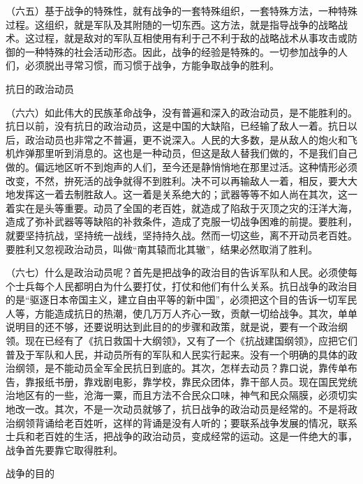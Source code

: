 \documentclass[UTF8, 12pt, a4paper]{ctexrep}
\begin{document}
（六五）基于战争的特殊性，就有战争的一套特殊组织，一套特殊方法，一种特殊过程。这组织，就是军队及其附随的一切东西。这方法，就是指导战争的战略战术。这过程，就是敌对的军队互相使用有利于己不利于敌的战略战术从事攻击或防御的一种特殊的社会活动形态。因此，战争的经验是特殊的。一切参加战争的人们，必须脱出寻常习惯，而习惯于战争，方能争取战争的胜利。

抗日的政治动员

（六六）如此伟大的民族革命战争，没有普遍和深入的政治动员，是不能胜利的。抗日以前，没有抗日的政治动员，这是中国的大缺陷，已经输了敌人一着。抗日以后，政治动员也非常之不普遍，更不说深入。人民的大多数，是从敌人的炮火和飞机炸弹那里听到消息的。这也是一种动员，但这是敌人替我们做的，不是我们自己做的。偏远地区听不到炮声的人们，至今还是静悄悄地在那里过活。这种情形必须改变，不然，拚死活的战争就得不到胜利。决不可以再输敌人一着，相反，要大大地发挥这一着去制胜敌人。这一着是关系绝大的；武器等等不如人尚在其次，这一着实在是头等重要。动员了全国的老百姓，就造成了陷敌于灭顶之灾的汪洋大海，造成了弥补武器等等缺陷的补救条件，造成了克服一切战争困难的前提。要胜利，就要坚持抗战，坚持统一战线，坚持持久战。然而一切这些，离不开动员老百姓。要胜利又忽视政治动员，叫做“南其辕而北其辙”，结果必然取消了胜利。

（六七）什么是政治动员呢？首先是把战争的政治目的告诉军队和人民。必须使每个士兵每个人民都明白为什么要打仗，打仗和他们有什么关系。抗日战争的政治目的是“驱逐日本帝国主义，建立自由平等的新中国”，必须把这个目的告诉一切军民人等，方能造成抗日的热潮，使几万万人齐心一致，贡献一切给战争。其次，单单说明目的还不够，还要说明达到此目的的步骤和政策，就是说，要有一个政治纲领。现在已经有了《抗日救国十大纲领》，又有了一个《抗战建国纲领》，应把它们普及于军队和人民，并动员所有的军队和人民实行起来。没有一个明确的具体的政治纲领，是不能动员全军全民抗日到底的。其次，怎样去动员？靠口说，靠传单布告，靠报纸书册，靠戏剧电影，靠学校，靠民众团体，靠干部人员。现在国民党统治地区有的一些，沧海一粟，而且方法不合民众口味，神气和民众隔膜，必须切实地改一改。其次，不是一次动员就够了，抗日战争的政治动员是经常的。不是将政治纲领背诵给老百姓听，这样的背诵是没有人听的；要联系战争发展的情况，联系士兵和老百姓的生活，把战争的政治动员，变成经常的运动。这是一件绝大的事，战争首先要靠它取得胜利。

战争的目的
\end{document}
